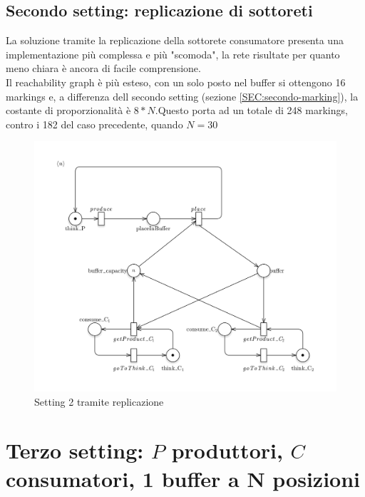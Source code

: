 \documentclass{article}
\begin{document}
\newpage
\subsection{Secondo  setting: replicazione di sottoreti}\label{SEC:secondo-replica}
La soluzione tramite la replicazione della sottorete consumatore presenta una implementazione più complessa e più "scomoda", la rete risultate per quanto meno chiara è ancora di facile comprensione.\\
Il reachability graph è più esteso, con un solo posto nel buffer si ottengono 16 markings e, a differenza dell secondo setting (sezione \ref{SEC:secondo-marking}), la costante di proporzionalità è $8*N$.Questo porta ad un totale di 248 markings, contro i 182 del caso precedente, quando $N = 30$

\begin{figure}[!h]
\centering
\includegraphics[width=\textwidth]{./Esercizio2_img/setting2_scale.png}
\caption{Setting 2 tramite replicazione} \label{FIG:setting2_scale}
\end{figure}

\newpage
\section{Terzo  setting: $P$ produttori, $C$ consumatori,   1 buffer a N posizioni}\label{SEC:terzo}
\end{document}
